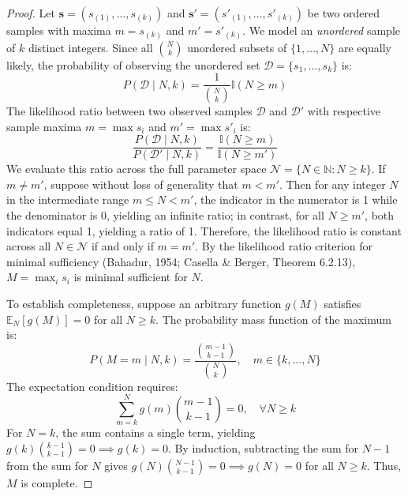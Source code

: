 \documentclass[10pt,a4paper]{article}
\begin{document}
\begin{proof}
Let $\mathbf{s} = (s_{(1)}, \dots, s_{(k)})$ and $\mathbf{s}' = (s'_{(1)}, \dots, s'_{(k)})$ be two ordered samples with maxima $m = s_{(k)}$ and $m' = s'_{(k)}$. We model an \emph{unordered} sample of $k$ distinct integers.  Since all $\binom{N}{k}$ unordered subsets of $\{1,\dots,N\}$ are equally likely, the probability of observing the unordered set $\mathcal{D}=\{s_1,\dots,s_k\}$ is:
\begin{equation}
P(\mathcal{D} \mid N, k) = \frac{1}{\binom{N}{k}} \mathbb{I}(N \ge m)
\label{eq:likelihood}
\end{equation}
The likelihood ratio between two observed samples $\mathcal{D}$ and $\mathcal{D}'$ with respective sample maxima $m = \max s_i$ and $m' = \max s'_i$ is:
\begin{equation}
\frac{P(\mathcal{D} \mid N, k)}{P(\mathcal{D}' \mid N, k)} = \frac{\mathbb{I}(N \ge m)}{\mathbb{I}(N \ge m')}
\end{equation}
We evaluate this ratio across the full parameter space $\mathcal{N} = \{N \in \mathbb{N} : N \ge k\}$. If $m \ne m'$, suppose without loss of generality that $m < m'$. Then for any integer $N$ in the intermediate range $m \le N < m'$, the indicator in the numerator is 1 while the denominator is 0, yielding an infinite ratio; in contrast, for all $N \ge m'$, both indicators equal 1, yielding a ratio of 1. Therefore, the likelihood ratio is constant across all $N \in \mathcal{N}$ if and only if $m = m'$. By the likelihood ratio criterion for minimal sufficiency (Bahadur, 1954; Casella \& Berger, Theorem 6.2.13), $M = \max_i s_i$ is minimal sufficient for $N$.

To establish completeness, suppose an arbitrary function $g(M)$ satisfies $\mathbb{E}_N[g(M)] = 0$ for all $N \ge k$. The probability mass function of the maximum is:
\begin{equation}
P(M = m \mid N, k) = \frac{\binom{m-1}{k-1}}{\binom{N}{k}}, \quad m \in \{k, \dots, N\}
\label{eq:pmf_m}
\end{equation}
The expectation condition requires:
\begin{equation}
\sum_{m=k}^N g(m) \binom{m-1}{k-1} = 0, \quad \forall N \ge k
\end{equation}
For $N = k$, the sum contains a single term, yielding $g(k) \binom{k-1}{k-1} = 0 \implies g(k) = 0$. By induction, subtracting the sum for $N-1$ from the sum for $N$ gives $g(N) \binom{N-1}{k-1} = 0 \implies g(N) = 0$ for all $N \ge k$. Thus, $M$ is complete.
\end{proof}
\end{document}
